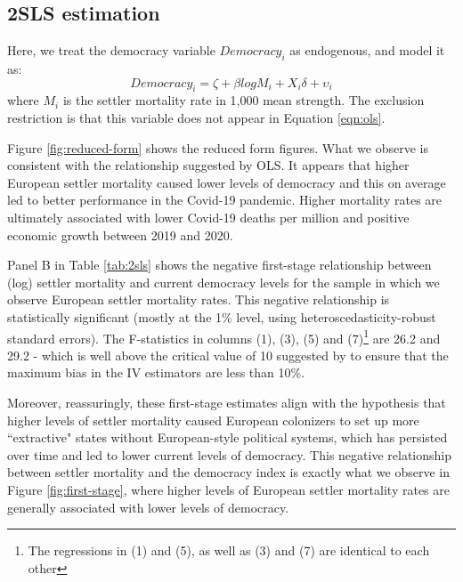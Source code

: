 
\subsection{2SLS estimation}

    Here, we treat the democracy variable $Democracy_i$ as endogenous, and model it as:
    \begin{equation}
        \label{eqn:2sls}
        Democracy_i = \zeta + \beta log M_i + X_i \delta + \upsilon_i
    \end{equation}
    where $M_i$ is the settler mortality rate in 1,000 mean strength. The exclusion restriction is that this variable does not appear in Equation \ref{eqn:ols}. 
    
Figure \ref{fig:reduced-form} shows the reduced form figures. What we observe is consistent with the relationship suggested by OLS. It appears that higher European settler mortality caused lower levels of democracy and this on average led to better performance in the Covid-19 pandemic. Higher mortality rates are ultimately associated with lower Covid-19 deaths per million and positive economic growth between 2019 and 2020. 
    
Panel B in Table \ref{tab:2sls} shows the negative first-stage relationship between (log) settler mortality and current democracy levels for the sample in which we observe European settler mortality rates. This negative relationship is statistically significant (mostly at the 1\% level, using heteroscedasticity-robust standard errors). The F-statistics in columns (1), (3), (5) and (7)\footnote{The regressions in (1) and (5), as well as (3) and (7) are identical to each other} are 26.2 and 29.2 - which is well above the critical value of 10 suggested by \textcite{staiger-stock} to ensure that the maximum bias in the IV estimators are less than 10\%. 

Moreover, reassuringly, these first-stage estimates align with the hypothesis that higher levels of settler mortality caused European colonizers to set up more ``extractive" states without European-style political systems, which has persisted over time and led to lower current levels of democracy. This negative relationship between settler mortality and the democracy index is exactly what we observe in Figure \ref{fig:first-stage}, where higher levels of European settler mortality rates are generally associated with lower levels of democracy. 

